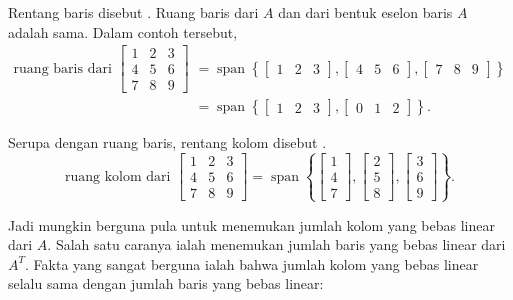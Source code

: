 Rentang baris disebut \emph{}.
Ruang baris dari $A$ dan dari bentuk eselon baris $A$ adalah sama.
Dalam contoh tersebut,
\begin{equation*}
\begin{split}
\text{ruang baris dari }
\begin{bmatrix}
1 & 2 & 3 \\
4 & 5 & 6 \\
7 & 8 & 9
\end{bmatrix}
& =
\operatorname{span}
\left\{
\begin{bmatrix}
1 & 2 & 3
\end{bmatrix}
,
\begin{bmatrix}
4 & 5 & 6
\end{bmatrix}
,
\begin{bmatrix}
7 & 8 & 9
\end{bmatrix}
\right\}
\\
& =
\operatorname{span}
\left\{
\begin{bmatrix}
1 & 2 & 3
\end{bmatrix}
,
\begin{bmatrix}
0 & 1 & 2
\end{bmatrix}
\right\} .
\end{split}
\end{equation*}

\medskip

Serupa dengan ruang baris, rentang kolom disebut
\emph{}.
\begin{equation*}
\text{ruang kolom dari }
\begin{bmatrix}
1 & 2 & 3 \\
4 & 5 & 6 \\
7 & 8 & 9
\end{bmatrix}
=
\operatorname{span}
\left\{
\begin{bmatrix}
1 \\ 4 \\ 7
\end{bmatrix}
,
\begin{bmatrix}
2 \\ 5 \\ 8
\end{bmatrix}
,
\begin{bmatrix}
3 \\ 6 \\ 9
\end{bmatrix}
\right\} .
\end{equation*}

Jadi mungkin berguna pula untuk menemukan jumlah kolom yang bebas linear
dari $A$. Salah satu caranya ialah menemukan jumlah baris yang bebas linear
dari $A^T$. Fakta yang sangat berguna ialah bahwa jumlah
kolom yang bebas linear
selalu sama dengan jumlah baris yang bebas linear:

